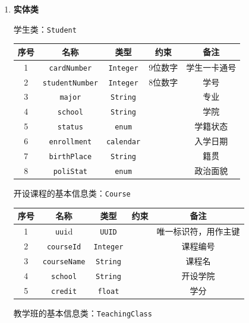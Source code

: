 \documentclass{article}
\begin{document}
\begin{enumerate}
\item \textbf{实体类}

学生类：\texttt{Student}
\begin{table}[H]
   \centering
    \begin{tabular}{ccccc}
    \hline
    序号&名称    & 类型    & 约束    & 备注 \\
    \hline
    1&\texttt{cardNumber} & \texttt{Integer}   & 9位数字  & 学生一卡通号 \\
    2&\texttt{studentNumber} & \texttt{Integer}   & 8位数字  & 学号 \\
    3&\texttt{major} & \texttt{String}   &  & 专业 \\
    4&\texttt{school} & \texttt{String}   &  & 学院 \\
    5&\texttt{status} & \texttt{enum}   &  & 学籍状态 \\
    6&\texttt{enrollment} & \texttt{calendar}   &  & 入学日期 \\
    7&\texttt{birthPlace} & \texttt{String}   &  & 籍贯 \\
    8&\texttt{poliStat} & \texttt{enum}   &  & 政治面貌 \\
    \hline
    \end{tabular}%
\end{table}

开设课程的基本信息类：\texttt{Course}
\begin{table}[H]
  \centering
    \begin{tabular}{ccccc}
    \hline
    序号&名称    & 类型    & 约束    & 备注 \\
    \hline
    1&\texttt{uui}d  & \texttt{UUID}  &       & 唯一标识符，用作主键 \\
    2&\texttt{courseId} & \texttt{Integer}   &  & 课程编号 \\
    3&\texttt{courseName} & \texttt{String} &       & 课程名 \\
    4&\texttt{school} & \texttt{String} &       & 开设学院 \\
    5&\texttt{credit} & \texttt{float} &       & 学分 \\
    \hline
    \end{tabular}%
\end{table}%

教学班的基本信息类：\texttt{TeachingClass}


\end{enumerate}
\end{document}

